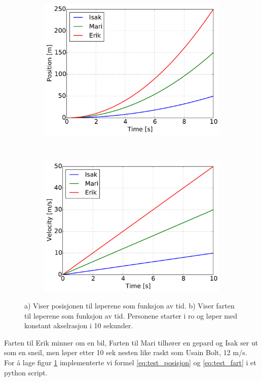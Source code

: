 \begin{figure}[H]
    \centering
    \begin{subfigure}{0.5\textwidth}
        \centering
        \includegraphics[width=\linewidth]{bilder/advanced1.pdf}
        \caption{}
    \end{subfigure}%
    ~
    \begin{subfigure}{0.5\textwidth}
        \centering
        \includegraphics[width=\linewidth]{bilder/advanced2.pdf}
        \caption{}
    \end{subfigure}
    \caption{a) Viser posisjonen til løperene som funksjon av tid.  b) Viser farten til løperene som funksjon av tid. Personene starter i ro og løper med konstant akselrasjon i 10 sekunder.}
    \label{fig:advanced}
\end{figure}

Farten til Erik minner om en bil, Farten til Mari tilhører en gepard og Isak ser
ut som en sneil, men løper etter 10 sek nesten like raskt som Usain Bolt, 12 m/s. For å lage figur
\ref{fig:advanced} implementerte vi formel \ref{eq:test_posisjon} og \ref{eq:test_fart}
i et python script.


